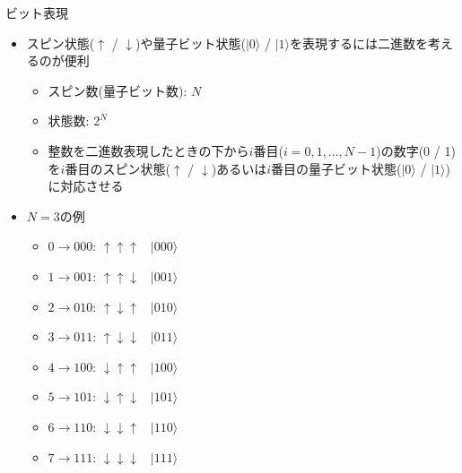 
\begin{frame}[t,fragile]{ビット表現}
  \begin{itemize}
  \item スピン状態($\uparrow$ / $\downarrow$)や量子ビット状態($|0\rangle$ / $|1\rangle$を表現するには二進数を考えるのが便利
    \begin{itemize}
    \item スピン数(量子ビット数): $N$
    \item 状態数: $2^N$
    \item 整数を二進数表現したときの下から$i$番目($i=0,1,\ldots,N-1$)の数字(0 / 1)を$i$番目のスピン状態($\uparrow$ / $\downarrow$)あるいは$i$番目の量子ビット状態($|0\rangle$ / $|1\rangle$)に対応させる
    \end{itemize}
  \item $N=3$の例
    \begin{itemize}
    \item $0 \rightarrow 000$: $\uparrow\uparrow\uparrow$ \ $|000\rangle$
    \item $1 \rightarrow 001$: $\uparrow\uparrow\downarrow$ \ $|001\rangle$
    \item $2 \rightarrow 010$: $\uparrow\downarrow\uparrow$ \ $|010\rangle$
    \item $3 \rightarrow 011$: $\uparrow\downarrow\downarrow$ \ $|011\rangle$
    \item $4 \rightarrow 100$: $\downarrow\uparrow\uparrow$ \ $|100\rangle$
    \item $5 \rightarrow 101$: $\downarrow\uparrow\downarrow$ \ $|101\rangle$
    \item $6 \rightarrow 110$: $\downarrow\downarrow\uparrow$ \ $|110\rangle$
    \item $7 \rightarrow 111$: $\downarrow\downarrow\downarrow$ \ $|111\rangle$
    \end{itemize}
  \end{itemize}
\end{frame}
